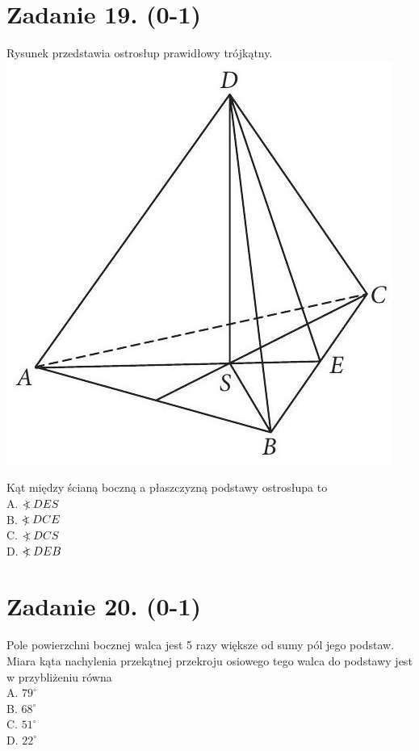 \documentclass[10pt]{article}
\newcommand\Varangle{\mathop{{<\!\!\!\!\!\text{\small)}}\:}\nolimits}
\begin{document}
\section*{Zadanie 19. (0-1)}
Rysunek przedstawia ostrosłup prawidłowy trójkątny.\\
\includegraphics[max width=\textwidth, center]{2024_11_21_72158d4a4efa7dd894bcg-08(1)}

Kąt między ścianą boczną a płaszczyzną podstawy ostrosłupa to\\
A. \(\Varangle D E S\)\\
B. \(\Varangle D C E\)\\
C. \(\Varangle D C S\)\\
D. \(\Varangle D E B\)

\section*{Zadanie 20. (0-1)}
Pole powierzchni bocznej walca jest 5 razy większe od sumy pól jego podstaw. Miara kąta nachylenia przekątnej przekroju osiowego tego walca do podstawy jest w przybliżeniu równa\\
A. \(79^{\circ}\)\\
B. \(68^{\circ}\)\\
C. \(51^{\circ}\)\\
D. \(22^{\circ}\)
\end{document}
